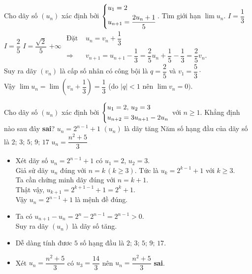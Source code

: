 \begin{ex}%
	Cho dãy số $ \left(u_n\right) $ xác định bởi  $\left\{\begin{aligned}&u_1 = 2\\ &u_{n+1} = \dfrac{2u_n + 1}{5}\end{aligned}\right. $. Tìm giới hạn $ \lim u_n. $
	\choice
	{\True  $ I= \dfrac{1}{3} $}
	{ $ I = \dfrac{2}{5} $}
	{ $ I  = \dfrac{\sqrt{2}}{5} $}
	{ $ +\infty $}	
	\loigiai
	{$\begin{aligned}
		\text{Đặt } &u_n = v_n + \dfrac{1}{3} \\
		\Rightarrow &v_{n+1} = u_{n+1} - \dfrac{1}{3} = \dfrac{2}{5} u_n + \dfrac{1}{5} - \dfrac{1}{3} = \dfrac{2}{5} v_n.
		\end{aligned}$\\
		Suy ra dãy $ \left(v_n\right) $ là cấp số nhân có công bội là $ q = \dfrac{2}{5} $ và $ v_1 = \dfrac{5}{3} \cdot $\\
		Vậy $ \lim u_n = \lim \left(v_n + \dfrac{1}{3}\right) = \dfrac{1}{3}$ (do $ \left|q \right| < 1  $ nên $ \lim v_n = 0). $
	}
\end{ex}
\begin{ex}%
	Cho dãy số $ \left(u_n\right) $ xác định bởi  $\left\{\begin{aligned}&u_1 = 2, \, u_2 = 3\\ &u_{n+2} = 3u_{n + 1} -2u_{n}\end{aligned}\right.  $ với $ n \ge 1 $. Khẳng định nào sau đây \textbf{sai}?	
	\choice
	{$ u_n = 2^{n-1} + 1 $ }
	{$ \left(u_n\right) $ là dãy tăng}
	{Năm số hạng đầu của dãy số là $2; \, 3; \,  5; \, 9; \, 17$ }
	{\True $ u_n = \dfrac{n^2+5}{3} $ }	
	\loigiai
	{\begin{itemize}
			\item Xét dãy số $ u_n = 2^{n-1} + 1 $ có $ u_1 = 2 $, $ u_2 = 3 $. \\Giả sử dãy $ u_n $ đúng với $ n = k \, (k \ge 3)$. Tức là $ u_k = 2^{k-1} + 1 $ với $ k \ge 3 $. \\Ta cần chứng minh dãy đúng với $ n = k+1 $. \\
			Thật vậy, $ u_{k+1} = 2^{k+1-1} + 1   = 2^k + 1$.\\
			Vậy $ u_n = 2^{n-1} + 1 $ là mệnh đề đúng.
			\item Ta có $ u_{n+1} - u_n = 2^n - 2^{n-1} = 2^{n-1} > 0 $.\\
			Suy ra dãy $ \left(u_n\right) $ là dãy số tăng.
			\item Dễ dàng tính đươc $ 5 $ số hạng đầu là $2; \, 3; \,  5; \, 9; \, 17$. 
			\item Xét $ u_n = \dfrac{n^2+5}{3} $ có $ u_3 = \dfrac{14}{3} $ nên  $ u_n = \dfrac{n^2+5}{3} $  \textbf{sai}.
		\end{itemize}
		
	}
\end{ex}
